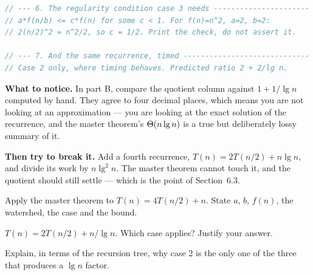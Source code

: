 \begin{lab}
\begin{lstlisting}[language=C++]
// --- 6. The regularity condition case 3 needs ----------------------
// a*f(n/b) <= c*f(n) for some c < 1. For f(n)=n^2, a=2, b=2:
// 2(n/2)^2 = n^2/2, so c = 1/2. Print the check, do not assert it.

// --- 7. And the same recurrence, timed -----------------------------
// Case 2 only, where timing behaves. Predicted ratio 2 + 2/lg n.
\end{lstlisting}

\textbf{What to notice.} In part B, compare the quotient column against
$1 + 1/\lg n$ computed by hand. They agree to four decimal places, which means
you are not looking at an approximation --- you are looking at the exact
solution of the recurrence, and the master theorem's $\Theta(n \operatorname{lg} n)$ is a
true but deliberately lossy summary of it.

\smallskip
\textbf{Then try to break it.} Add a fourth recurrence,
$T(n) = 2T(n/2) + n\lg n$, and divide its work by $n\lg^{2}n$. The master
theorem cannot touch it, and the quotient should still settle --- which is the
point of Section~6.3.
\end{lab}

\begin{checkpoint}
\begin{tightnum}
  \item Apply the master theorem to $T(n) = 4T(n/2) + n$. State $a$, $b$,
        $f(n)$, the watershed, the case and the bound.
  \item $T(n) = 2T(n/2) + n/\lg n$. Which case applies? Justify your answer.
  \item Explain, in terms of the recursion tree, why case 2 is the only one of
        the three that produces a $\lg n$ factor.
\end{tightnum}
\end{checkpoint}

